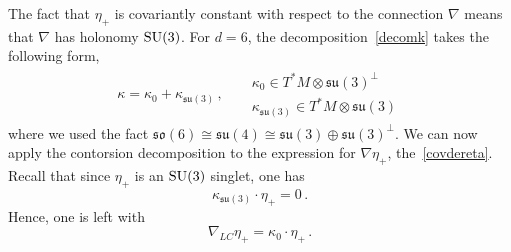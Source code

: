 \documentclass[debug]{phd}
\begin{document}
				The fact that $\eta_+$ is covariantly constant with respect to the connection $\nabla$ means that $\nabla$ has holonomy $\mathrm{SU}(3)$.
			For $d=6$, the decomposition~\eqref{decomk} takes the following form,
						\begin{align}
							&&	\kappa = \kappa_0 + \kappa_{\mathfrak{su}(3)}\, , & & 	\begin{array}{l}
																				\kappa_0 			\in T^*M \otimes \mathfrak{su}(3)^\perp \\[1mm]
																				\kappa_{\mathfrak{su}(3)} \in T^*M \otimes \mathfrak{su}(3)
																			\end{array}	&&
						\end{align}
				where we used the fact $\mathfrak{so}(6) \cong \mathfrak{su}(4) \cong \mathfrak{su}(3) \oplus \mathfrak{su}(3)^\perp$.
				We can now apply the contorsion decomposition to the expression for $\nabla \eta_+$, the~\eqref{covdereta}.
				Recall that since $\eta_+$ is an $\mathrm{SU}(3)$ singlet, one has
						\begin{equation}
							\kappa_{\mathfrak{su}(3)} \cdot \eta_+ = 0\, .
						\end{equation}
				Hence, one is left with
						\begin{equation}\label{conteta}
							\nabla_{LC} \eta_+ = \kappa_0 \cdot \eta_+\, .
						\end{equation}
\end{document}

